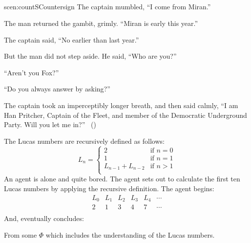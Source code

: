 \documentclass[10pt]{article}
\begin{document}
\subsection*{}
\label{sec:scen3}

\begin{note}
  \begin{rscenario}{scen:countS}{Countersign}%
    \indent The captain mumbled, ``I come from Miran.''

    The man returned the gambit, grimly.
    ``Miran is early this year.''

    The captain said, ``No earlier than last year.''

    But the man did not step aside.
    He said, ``Who are you?''

    ``Aren't you Fox?''

    ``Do you always answer by asking?''

    The captain took an imperceptibly longer breath, and then said calmly,
    ``I am Han Pritcher, Captain of the Fleet, and member of the Democratic Underground Party.
    Will you let me in?''%
    \mbox{ }\hfill\mbox{(\cite[70]{Asimov:1945aa})}%
    \newline
  \end{rscenario}
\end{note}

\begin{note}
    \begin{scenario}%
    \label{scen:LucasNums}%
    The Lucas numbers are recursively defined as follows:%
    \[
      L_{n} = \left\{
        \begin{array}{ll}
          2 & \text{if } n = 0 \\
          1 & \text{if } n = 1 \\
          L_{n-1} + L_{n-2} & \text{if } n > 1 \\
        \end{array}
      \right.
    \]
    An agent is alone and quite bored.
    The agent sets out to calculate the first ten Lucas numbers by applying the recursive definition.
    The agent begins:
    \[
      \begin{array}{cccccc}
        L_{0} & L_{1} & L_{2} & L_{3} & L_{4} & \cdots \\
        \hline
        2 & 1 & 3 & 4 & 7 & \cdots \\
      \end{array}
    \]
    And, eventually concludes:
    \begin{center}
    \end{center}
    From some \pool{} \(\Phi\) which includes the \agents{} understanding of the Lucas numbers.
  \end{scenario}
\end{note}
\end{document}
